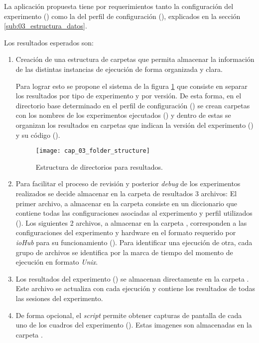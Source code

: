 \documentclass[\main/main.tex]{subfiles}
\begin{document}
			La aplicación propuesta tiene por requerimientos tanto la configuración del experimento () como la del perfil de configuración (), explicados en la sección \ref{sub:03_estructura_datos}.

			Los resultados esperados son:
			\begin{enumerate}\setlength\itemsep{-0.5em}
				\item Creación de una estructura de carpetas que permita almacenar la información de las distintas instancias de ejecución de forma organizada y clara. 

				Para lograr esto se propone el sistema de la figura \ref{fig:03_folder_structure} que consiste en separar los resultados por tipo de experimento y por versión. De esta forma, en el directorio base determinado en el perfil de configuración () se crean carpetas con los nombres de los experimentos ejecutados () y dentro de estas se organizan los resultados en carpetas que indican la versión del experimento () y su código ().  
				\begin{figure}[H]
					\centering
					\texttt{[image: cap\_03\_folder\_structure]}
					\caption{Estructura de directorios para resultados.}
					\label{fig:03_folder_structure}
				\end{figure} 

				\item Para facilitar el proceso de revisión y posterior \textit{debug} de los experimentos realizados se decide almacenar en la carpeta de resultados 3 archivos: El primer archivo, a almacenar en la carpeta  consiste en un diccionario que contiene todas las configuraciones asociadas al experimento y perfil utilizados (). Los siguientes 2 archivos, a almacenar en la carpeta , corresponden a las configuraciones del experimento y hardware en el formato requerido por \textit{ioHub} para su funcionamiento (). Para identificar una ejecución de otra, cada grupo de archivos se identifica por la marca de tiempo del momento de ejecución en formato \textit{Unix}.

				\item Los resultados del experimento () se almacenan directamente en la carpeta . Este archivo se actualiza con cada ejecución y contiene los resultados de todas las sesiones del experimento. 

				\item De forma opcional, el \textit{script} permite obtener capturas de pantalla de cada uno de los cuadros del experimento (). Estas imagenes son almacenadas en la carpeta . 
			\end{enumerate}
\end{document}
